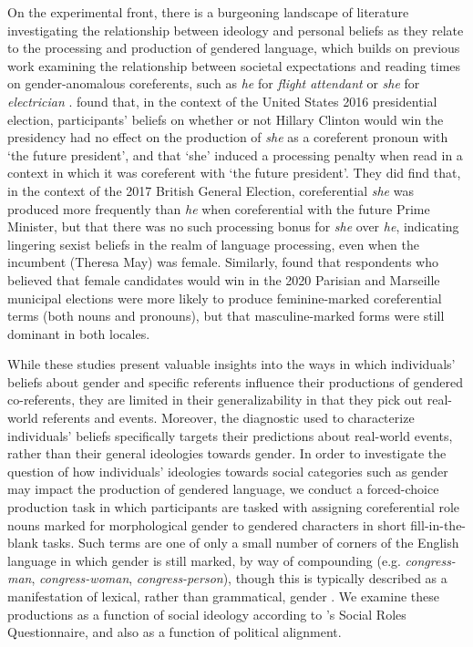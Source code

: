 On the experimental front, there is a burgeoning landscape of literature investigating the relationship between ideology and personal beliefs as they relate to the processing and production of gendered language, which builds on previous work examining the relationship between societal expectations and reading times on gender-anomalous coreferents, such as \textit{he} for \textit{flight attendant} or \textit{she} for \textit{electrician} \parencite{foertsch1997search,duffy2004violating}. \textcite{von2020implicit} found that, in the context of the United States 2016 presidential election, participants' beliefs on whether or not Hillary Clinton would win the presidency had no effect on the production of \textit{she} as a coreferent pronoun with `the future president', and that `she' induced a processing penalty when read in a context in which it was coreferent with `the future president'. They did find that, in the context of the 2017 British General Election, coreferential \textit{she} was produced more frequently than \textit{he} when coreferential with the future Prime Minister, but that there was no such processing bonus for \textit{she} over \textit{he}, indicating lingering sexist beliefs in the realm of language processing, even when the incumbent (Theresa May) was female. Similarly, \textcite{pozniak2021failures} found that respondents who believed that female candidates would win in the 2020 Parisian and Marseille municipal elections were more likely to produce feminine-marked coreferential terms (both nouns and pronouns), but that masculine-marked forms were still dominant in both locales. \par 
While these studies present valuable insights into the ways in which individuals' beliefs about gender and specific referents influence their productions of gendered co-referents, they are limited in their generalizability in that they pick out real-world referents and events. Moreover, the diagnostic used to characterize individuals' beliefs specifically targets their predictions about real-world events, rather than their general ideologies towards gender. In order to investigate the question of how individuals' ideologies towards social categories such as gender may impact the production of gendered language, we conduct a forced-choice production task in which participants are tasked with assigning coreferential role nouns \parencite{misersky2014norms} marked for morphological gender to gendered characters in short fill-in-the-blank tasks. Such terms are one of only a small number of corners of the English language in which gender is still marked, by way of compounding (e.g. \textit{congress-man}, \textit{congress-woman}, \textit{congress-person}), though this is typically described as a manifestation of lexical, rather than grammatical, gender \parencite{kastovsky2011inflectional,hellinger2001english}. We examine these productions as a function of social ideology according to \textcite{baber2006social}'s Social Roles Questionnaire, and also as a function of political alignment. \par

